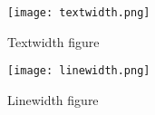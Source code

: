 \documentclass[letterpaper, 10pt]{article}
\begin{document}
\begin{figure}[hp]
\centering
\texttt{[image: textwidth.png]}
\caption{Textwidth figure}
\end{figure}

\begin{figure}[hp]
\centering
\texttt{[image: linewidth.png]}
\caption{Linewidth figure}
\end{figure}
\end{document}

